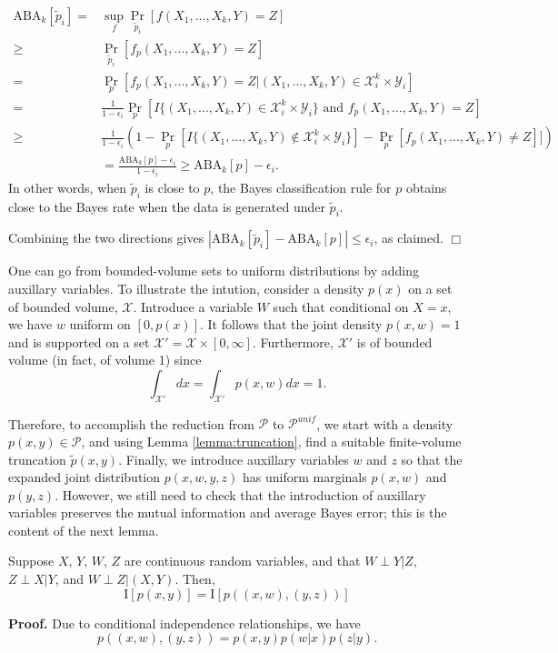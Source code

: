 \documentclass[12pt]{article}
\begin{document}
\begin{align*}
\text{ABA}_k[\tilde{p}_i] =& \sup_f \Pr_{\tilde{p}_i}[f(X_1,...,X_k, Y) = Z]
\\\geq &  \Pr_{\tilde{p}_i}[f_p(X_1,...,X_k, Y) = Z]
\\=& \Pr_p[f_p(X_1,...,X_k, Y) = Z| (X_1,...,X_k, Y)\in \mathcal{X}_i^k \times \mathcal{Y}_i]
\\=& \frac{1}{1-\epsilon_i} \Pr_p[I\{(X_1,...,X_k, Y)\in \mathcal{X}_i^k \times \mathcal{Y}_i\} \text{ and }f_p(X_1,...,X_k, Y) = Z]
\\\geq & \frac{1}{1-\epsilon_i} \left(1 - \Pr_p[I\{(X_1,...,X_k, Y)\notin \mathcal{X}_i^k \times \mathcal{Y}_i\}] - \Pr_p[f_p(X_1,...,X_k, Y) \neq Z]]\right)
\\&= \frac{\text{ABA}_k[p] - \epsilon_i}{1-\epsilon_i} \geq \text{ABA}_k[p] - \epsilon_i.
\end{align*}
In other words, when $\tilde{p}_i$ is close to $p$, the Bayes
classification rule for $p$ obtains close to the Bayes rate when the
data is generated under $\tilde{p}_i$.

Combining the two directions gives $|\text{ABA}_k[\tilde{p}_i]
- \text{ABA}_k[p]| \leq \epsilon_i$, as claimed. $\Box$

One can go from bounded-volume sets to uniform distributions by adding
auxillary variables.  To illustrate the intution, consider a density
$p(x)$ on a set of bounded volume, $\mathcal{X}$.  Introduce a
variable $W$ such that conditional on $X = x$, we have $w$ uniform on
$[0, p(x)]$.  It follows that the joint density $p(x, w) = 1$ and is
supported on a set $\mathcal{X}' = \mathcal{X} \times [0,\infty]$.
Furthermore, $\mathcal{X}'$ is of bounded volume (in fact, of volume 1) since
\[
\int_{\mathcal{X}'} dx = \int_{\mathcal{X}'} p(x, w) dx = 1.
\]

Therefore, to accomplish the reduction from $\mathcal{P}$ to
$\mathcal{P}^{unif}$, we start with a density
$p(x,y) \in \mathcal{P}$, and using Lemma \ref{lemma:truncation},
find a suitable finite-volume truncation $\tilde{p}(x, y).$ Finally,
we introduce auxillary variables $w$ and $z$ so that the expanded
joint distribution $p(x, w, y, z)$ has uniform marginals $p(x, w)$ and
$p(y, z)$.  However, we still need to check that the introduction of
auxillary variables preserves the mutual information and average Bayes
error; this is the content of the next lemma.

\begin{lemma}
Suppose $X$, $Y$, $W$, $Z$ are continuous random variables, and that
$W\perp Y|Z$, $Z \perp X|Y$, and $W \perp Z|(X,Y)$.  Then,
\[
\text{I}[p(x, y)] = \text{I}[p((x,w), (y,z))]
\]
\end{lemma}
\textbf{Proof.}
Due to conditional independence relationships, we have
\[
p((x,w), (y,z)) = p(x,y)p(w|x)p(z|y).
\]
\end{document}
